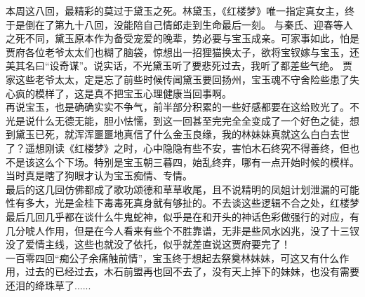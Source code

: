 %
\begin{solution}
    \large 本周这八回，最精彩的莫过于黛玉之死。林黛玉，《红楼梦》唯一指定真女主，终于是倒在了第九十八回，没能陪自己情郎走到生命最后一刻。
    与秦氏、迎春等人之死不同，黛玉原本作为备受宠爱的晚辈，势必要与宝玉成亲。可家事如此，怕是贾府各位老爷太太们也糊了脑袋，惊想出一招狸猫换太子，欲将宝钗嫁与宝玉，还美其名曰“设奇谋”。说实话，不光黛玉听了要悲死过去，我听了都差些气绝。
    贾家这些老爷太太，定是忘了前些时候传闻黛玉要回扬州，宝玉魂不守舍险些患了失心疯的模样了，这是真不把宝玉心理健康当回事啊。\\
    再说宝玉，也是确确实实不争气，前半部分积累的一些好感都要在这给败光了。不光是说什么无德无能，胆小怯懦，到这一回甚至完完全全变成了一个好色之徒，想到黛玉已死，就浑浑噩噩地真信了什么金玉良缘，我的林妹妹真就这么白白去世了？遥想刚读《红楼梦》之时，心中隐隐有些不安，害怕木石终究不得善终，但也不是该这么个下场。特别是宝玉朝三暮四，始乱终弃，哪有一点开始时候的模样。当时真是瞎了狗眼才认为宝玉痴情、专情。\\
    最后的这几回仿佛都成了歌功颂德和草草收尾，且不说精明的凤姐计划泄漏的可能性有多大，光是金桂下毒毒死真身就有够扯的。不去谈这些逻辑不合之处，红楼梦最后几回几乎都在谈什么牛鬼蛇神，似乎是在和开头的神话色彩做强行的对应，有几分唬人作用，但是在今人看来有些个不胜靠谱，无非是些风水凶兆，没了十三钗没了爱情主线，这些也就没了依托，似乎就差直说这贾府要完了！\\
    一百零四回“痴公子余痛触前情”，宝玉终于想起去祭奠林妹妹，可这又有什么作用，过去的已经过去，木石前盟再也回不去了，没有天上掉下的妹妹，也没有需要还泪的绛珠草了......
\end{solution}


%



%

